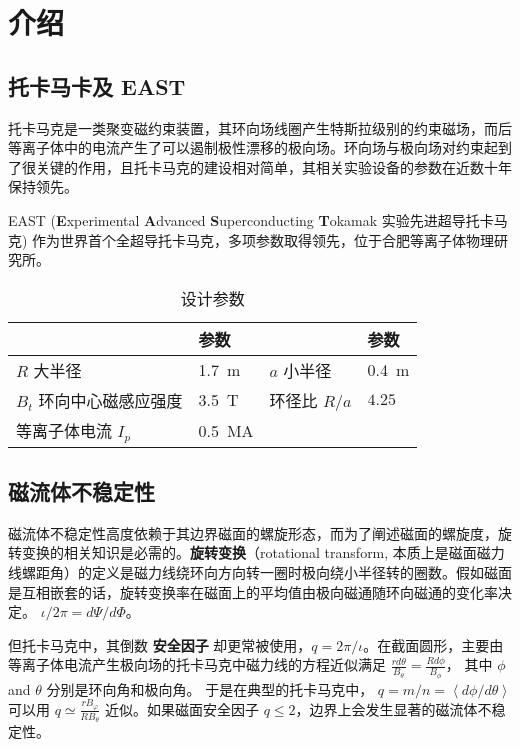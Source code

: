 \chapter{介绍}

\section{托卡马卡及 EAST}
托卡马克是一类聚变磁约束装置，其环向场线圈产生特斯拉级别的约束磁场，而后等离子体中的电流产生了可以遏制极性漂移的极向场。环向场与极向场对约束起到了很关键的作用，且托卡马克的建设相对简单，其相关实验设备的参数在近数十年保持领先。

EAST (\textbf{E}xperimental \textbf{A}dvanced \textbf{S}uperconducting \textbf{T}okamak 实验先进超导托卡马克) 作为世界首个全超导托卡马克，多项参数取得领先，位于合肥等离子体物理研究所。

\begin{table}[htb]
    \centering
    \caption{\east 设计参数}
    \label{tab:east_parameter}
    \begin{tabularx}{\linewidth}{lXlX}
        \toprule[1.5pt]
         & 参数 & & 参数\\
        \midrule[1pt]
        $R$ 大半径 &  \SI{1.7}{\meter} & $a$ 小半径 & \SI{0.4}{\meter}\\ 
        $B_t$ 环向中心磁感应强度 &  \SI{3.5}{\tesla} & 环径比 $R/a$ & $4.25$\\ 
        等离子体电流 $I_p$ & \SI{0.5}{\mega\ampere}&  &\\  %
        \bottomrule[1.5pt]
    \end{tabularx}
\end{table}




\section{磁流体不稳定性}
磁流体不稳定性高度依赖于其边界磁面的螺旋形态，而为了阐述磁面的螺旋度，旋转变换的相关知识是必需的。\textbf{旋转变换}（rotational transform, 本质上是磁面磁力线螺距角）的定义是磁力线绕环向方向转一圈时极向绕小半径转的圈数。假如磁面是互相嵌套的话，旋转变换率在磁面上的平均值由极向磁通随环向磁通的变化率决定。
$ \iota/2 \pi = d\Psi /d \Phi $。

但托卡马克中，其倒数 \textbf{安全因子} 却更常被使用，$q = 2\pi/\iota$。在截面圆形，主要由等离子体电流产生极向场的托卡马克中磁力线的方程近似满足 $ \frac{r d\theta}{B_\theta} = \frac{Rd\phi}{B_\phi} $，
其中 $ \phi $ and $\theta$ 分别是环向角和极向角。 于是在典型的托卡马克中， $ q = m/n = \left \langle d\phi /d\theta \right \rangle $ 可以用 $ q \simeq \frac{r B_\varphi}{R B_\theta} $ 近似。如果磁面安全因子 $q\leq 2$，边界上会发生显著的磁流体不稳定性。

